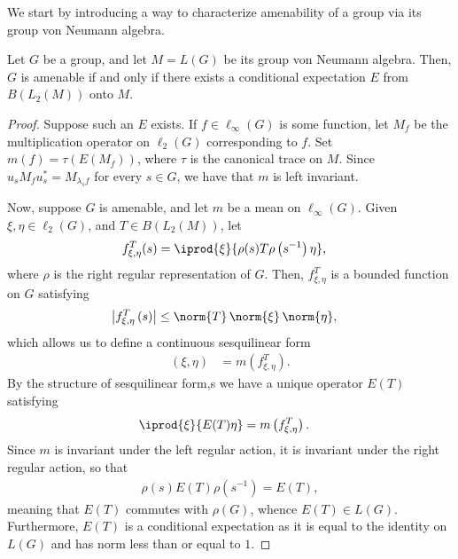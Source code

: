 \documentclass[10pt]{mypackage}
\begin{document}
We start by introducing a way to characterize amenability of a group via its group von Neumann algebra.
\begin{proposition}
  Let $G$ be a group, and let $M = L(G)$ be its group von Neumann algebra. Then, $G$ is amenable if and only if there exists a conditional expectation $E$ from $B\left( L_2\left( M \right) \right)$ onto $M$.
\end{proposition}
\begin{proof}
  Suppose such an $E$ exists. If $f\in \ell_{\infty}\left( G \right)$ is some function, let $M_f$ be the multiplication operator on $\ell_2\left( G \right)$ corresponding to $f$. Set $m(f) = \tau\left( E\left( M_f \right) \right)$, where $\tau$ is the canonical trace on $M$. Since $u_sM_fu_s^{\ast} = M_{\lambda_sf}$ for every $s\in G$, we have that $m$ is left invariant.

  Now, suppose $G$ is amenable, and let $m$ be a mean on $\ell_{\infty}\left( G \right)$. Given $\xi,\eta\in \ell_2\left( G \right)$, and $T\in B\left( L_2\left( M \right) \right)$, let
  \begin{align*}
    f_{\xi,\eta}^{T}(s) &= \iprod{\xi}{\rho(s)T\rho\left( s^{-1} \right)\eta},
  \end{align*}
  where $\rho$ is the right regular representation of $G$. Then, $f_{\xi,\eta}^{T}$ is a bounded function on $G$ satisfying
  \begin{align*}
    \left\vert f_{\xi,\eta}^{T}\left( s \right) \right\vert &\leq \norm{T}\,\norm{\xi}\,\norm{\eta},
  \end{align*}
  which allows us to define a continuous sesquilinear form
  \begin{align*}
    \left( \xi,\eta \right) &= m\left( f_{\xi,\eta}^{T} \right).
  \end{align*}
  By the structure of sesquilinear form,s we have a unique operator $E(T)$ satisfying
  \begin{align*}
    \iprod{\xi}{E(T)\eta} &= m\left( f_{\xi,\eta}^{T} \right).
  \end{align*}
  Since $m$ is invariant under the left regular action, it is invariant under the right regular action, so that 
  \begin{align*}
    \rho(s)E(T)\rho\left( s^{-1} \right) = E\left( T \right),
  \end{align*}
  meaning that $E(T)$ commutes with $\rho(G)$, whence $E(T)\in L(G)$. Furthermore, $E(T)$ is a conditional expectation as it is equal to the identity on $L(G)$ and has norm less than or equal to $1$.
\end{proof}
\end{document}
